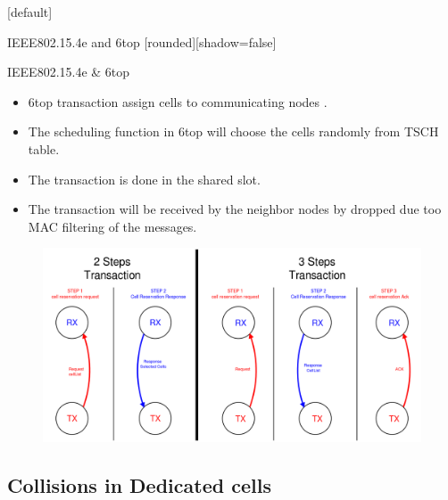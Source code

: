 \documentclass{beamer}
\makeatletter
\newenvironment{withoutheadline}{
        \setbeamertemplate{headline}[default]
        \def\beamer@entrycode{\vspace*{-\headheight}}
    }{}
\makeatother
\begin{document}
\begin{withoutheadline}
\begin{frame}{IEEE802.15.4e and 6top}
[rounded][shadow=false]




\begin{block}{IEEE802.15.4e \& 6top}
    \begin{itemize}
    \item 6top transaction assign cells to communicating nodes . 
    \item The scheduling function in 6top will choose the cells randomly from TSCH table.
    \item The transaction is done in the shared slot. 
    \item The transaction will be received by the neighbor nodes by dropped due too MAC filtering of the messages. 
    
    \end{itemize}
    \end{block}
    \centering
\begin{figure}[p]

\includegraphics[width=0.7\linewidth]{2,3steps.png}
\end{figure}

\end{frame}
\end{withoutheadline}





\subsection{Collisions in Dedicated cells}
\end{document}
